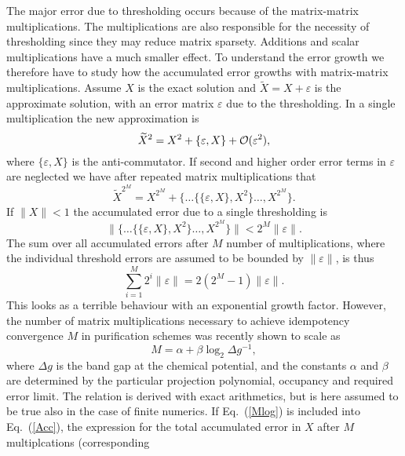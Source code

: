 The major error due to thresholding occurs because of the matrix-matrix
multiplications. The multiplications are also responsible for the
necessity of thresholding since they may reduce matrix sparsety.
Additions and scalar multiplications have a much smaller effect.
To understand the error growth we therefore have to study how
the accumulated error growths with matrix-matrix multiplications.
Assume $X$ is the exact solution and ${\widetilde X} = X + \varepsilon$ is
the approximate solution, with an error matrix $\varepsilon$ due to the
thresholding. In a single multiplication the  new approximation is
\begin{equation}
{\widetilde X}^2 = X^2 + \{ \varepsilon,X \} + {\cal O}(\varepsilon^2),
\end{equation}
where $\{ \varepsilon,X \}$ is the anti-commutator. If second and higher
order error terms in $\varepsilon$ are neglected we have after repeated
matrix multiplications that
\begin{equation}
{\widetilde X}^{2^M} = X^{2^M} + \{ \ldots \{\{ \varepsilon,X \},X^2 \} \ldots,X^{2^M}\}.
\end{equation}
If $\| X \| < 1$ the accumulated error due to a single thresholding is
\begin{equation}
\| \{ \ldots \{\{ \varepsilon,X \},X^2 \} \ldots,X^{2^M}\} \| < 2^M \|\varepsilon\|.
\end{equation}
The sum over all accumulated errors after $M$ number of multiplications, where
the individual threshold errors are assumed to be bounded by $\|\varepsilon\|$, is thus
\begin{equation}
\label{Acc}
\sum_{i=1}^{M} 2^i \|\varepsilon\| = 2(2^M-1)\|\varepsilon\|.
\end{equation}
This looks as a terrible behaviour with an exponential growth factor. However,
the number of matrix multiplications necessary to achieve idempotency convergence $M$
in purification schemes was recently shown to scale as \cite{Niklasson02b}
\begin{equation}
\label{Mlog}
M = \alpha + \beta \log_2 \Delta g^{-1},
\end{equation}
where $\Delta g$ is the band gap at the chemical potential, and
the constants $\alpha$ and $\beta$ are determined by the particular
projection polynomial, occupancy and required error limit.
The relation is derived with exact arithmetics, but is here assumed to
be true also in the case of finite numerics.
If Eq.\ (\ref{Mlog}) is included into Eq.\ (\ref{Acc}), the expression for the total
accumulated error in $X$ after $M$ multiplcations (corresponding
